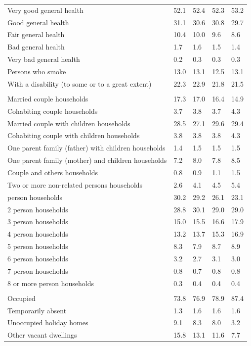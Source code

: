 \documentclass{article}
\begin{document}
\begin{table}[h]
\begin{tabular}{KTTTT}
    \hline
Very good general health & 52.1& 52.4&52.3& 53.2\\
Good general health & 31.1& 30.6& 30.8& 29.7\\
Fair general health & 10.4& 10.0& 9.6&  8.6\\
Bad general health & 1.7& 1.6&1.5& 1.4\\
Very bad general health & 0.2& 0.3&0.3& 0.3\\
    \hline
Persons who smoke & 13.0& 13.1&12.5& 13.1\\
    \hline
With a disability (to some or to a great extent) & 22.3& 22.9&21.8& 21.5\\
\hline
    \\ 
    \hline
Married couple households & 17.3& 17.0& 16.4& 14.9\\
Cohabiting couple households & 3.7& 3.8& 3.7& 4.3\\
Married couple with children households & 28.5& 27.1& 29.6& 29.4\\
Cohabiting couple with children households & 3.8& 3.8& 3.8& 4.3\\
One parent family (father) with  children households & 1.4& 1.5& 1.5& 1.5\\
One parent family (mother) and children households & 7.2& 8.0& 7.8& 8.5\\
Couple and others households  & 0.8& 0.9& 1.1& 1.5\\
Two or more non-related persons households & 2.6& 4.1& 4.5& 5.4\\
     person households & 30.2& 29.2& 26.1& 23.1\\
2 person households & 28.8& 30.1& 29.0& 29.0\\
3 person households & 15.0& 15.5& 16.6& 17.9\\
4 person households & 13.2& 13.7& 15.3& 16.9\\
5 person households & 8.3& 7.9& 8.7& 8.9\\
6 person households & 3.2& 2.7& 3.1& 3.0\\
7 person households & 0.8& 0.7& 0.8& 0.8\\
8 or more person households & 0.3& 0.4& 0.4& 0.4\\
\hline
    \\ 
    \hline
Occupied & 73.8& 76.9& 78.9& 87.4\\
Temporarily absent & 1.3& 1.6& 1.6& 1.6\\
Unoccupied holiday homes & 9.1& 8.3& 8.0& 3.2\\
Other vacant dwellings & 15.8& 13.1& 11.6&  7.7\\
\hline
\end{tabular}
\end{table}
\end{document}
